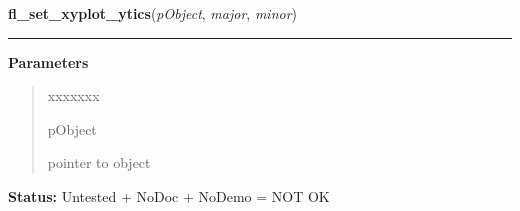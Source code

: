    \label{xformslib:library:fl_set_xyplot_ytics}

    \vspace{0.5ex}

\hspace{.8\funcindent}\begin{boxedminipage}{\funcwidth}

    \raggedright \textbf{fl\_set\_xyplot\_ytics}(\textit{pObject}, \textit{major}, \textit{minor})

    \vspace{-1.5ex}

    \rule{\textwidth}{0.5\fboxrule}
\setlength{\parskip}{2ex}
\setlength{\parskip}{1ex}
      \textbf{Parameters}
      \vspace{-1ex}

      \begin{quote}
        \begin{Ventry}{xxxxxxx}

          \item[pObject]

          pointer to object

        \end{Ventry}

      \end{quote}

\textbf{Status:} Untested + NoDoc + NoDemo = NOT OK



    \end{boxedminipage}

    \label{xformslib:library:fl_set_xyplot_xbounds}

    \vspace{0.5ex}

